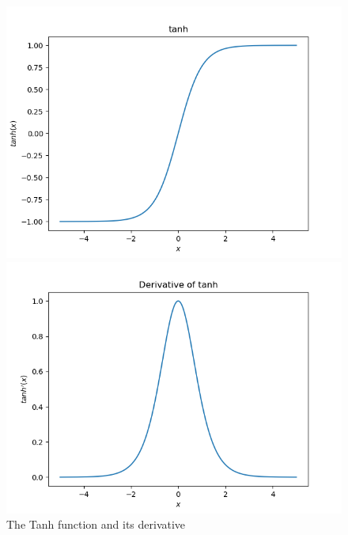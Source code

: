 \begin{solution}
\begin{figure}[ht]
\begin{center}
\begin{minipage}[b]{0.4\textwidth}
\begin{center}
\includegraphics[width=\textwidth]{Tanh.png}
\end{center}
\end{minipage}
\begin{minipage}[b]{0.4\textwidth}
\begin{center}
\includegraphics[width=\textwidth]{TanhDerivative.png}
\end{center}
\end{minipage}
\caption{The Tanh function and its derivative}
\label{fig:tanh}
\end{center}
\end{figure}
\end{solution}
